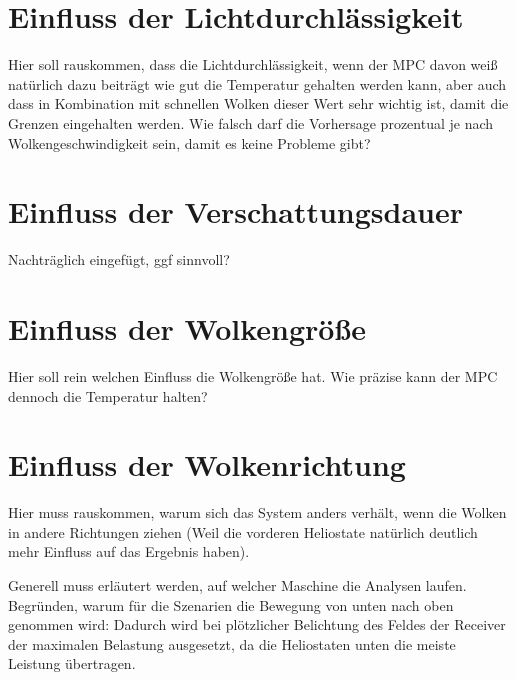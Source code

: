 \section{Einfluss der Lichtdurchlässigkeit} \label{sec_EinflussLichtdurchlässigkeit}
Hier soll rauskommen, dass die Lichtdurchlässigkeit, wenn der MPC davon weiß natürlich dazu beiträgt wie gut die Temperatur gehalten werden kann, aber auch dass in Kombination mit schnellen Wolken dieser Wert sehr wichtig ist, damit die Grenzen eingehalten werden.
Wie falsch darf die Vorhersage prozentual je nach Wolkengeschwindigkeit sein, damit es keine Probleme gibt?

\section{Einfluss der Verschattungsdauer} \label{sec_Verschattungsdauer}
Nachträglich eingefügt, ggf sinnvoll?

\section{Einfluss der Wolkengröße} \label{sec_EinflussGröße}
Hier soll rein welchen Einfluss die Wolkengröße hat.
Wie präzise kann der MPC dennoch die Temperatur halten?

\section{Einfluss der Wolkenrichtung} \label{sec_EinflussRichtung}
Hier muss rauskommen, warum sich das System anders verhält, wenn die Wolken in andere Richtungen ziehen (Weil die vorderen Heliostate natürlich deutlich mehr Einfluss auf das Ergebnis haben).

Generell muss erläutert werden, auf welcher Maschine die Analysen laufen.
Begründen, warum für die Szenarien die Bewegung von unten nach oben genommen wird: Dadurch wird bei plötzlicher Belichtung des Feldes der Receiver der maximalen Belastung ausgesetzt, da die Heliostaten unten die meiste Leistung übertragen.
